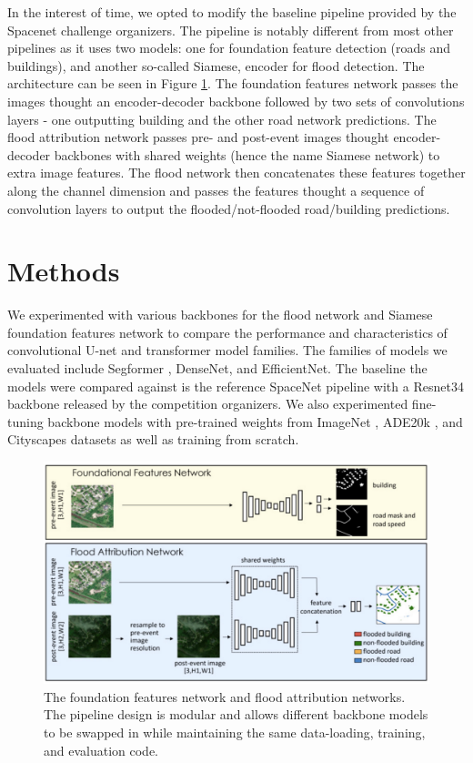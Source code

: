 \documentclass[10pt,twocolumn,letterpaper]{article}
\begin{document}
In the interest of time, we opted to modify the baseline pipeline provided by the Spacenet challenge organizers. The pipeline is notably different from most other pipelines as it uses two models: one for foundation feature detection (roads and buildings), and another so-called Siamese, encoder for flood detection. The architecture can be seen in Figure \ref{fig:baseline}. The foundation features network passes the images thought an encoder-decoder backbone followed by two sets of convolutions layers - one outputting building and the other road network predictions. The flood attribution network passes pre- and post-event images thought encoder-decoder backbones with shared weights (hence the name Siamese network) to extra image features. The flood network then concatenates these features together along the channel dimension and passes the features thought a sequence of convolution layers to output the flooded/not-flooded road/building predictions.

\section{Methods}
\label{sec:methods}

We experimented with various backbones for the flood network and Siamese foundation features network to compare the performance and characteristics of convolutional U-net and transformer model families. The families of models we evaluated include Segformer \cite{xie2021segformer}, DenseNet\cite{Huang2016DenselyCC}, and EfficientNet\cite{Tan_Le_2019}. The baseline the models were compared against is the reference SpaceNet pipeline \cite{spacenet8_baseline} with a Resnet34 backbone released by the competition organizers. We also experimented fine-tuning backbone models with pre-trained weights from ImageNet \cite{ILSVRC15}, ADE20k \cite{zhou2017scene}, and Cityscapes \cite{cordts2016cityscapes} datasets as well as training from scratch.

\begin{figure}[t]
  \centering
   \includegraphics[width=1.0\linewidth]{figures/baseline.jpg}
   \caption{The foundation features network and flood attribution networks. The pipeline design is modular and allows different backbone models to be swapped in while maintaining the same data-loading, training, and evaluation code.}
   \label{fig:baseline}
\end{figure}
\end{document}
